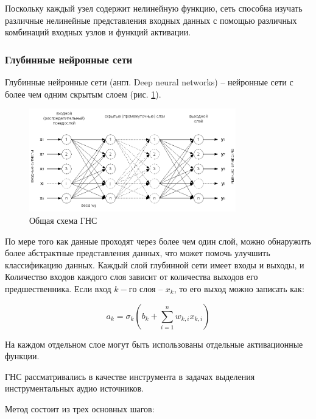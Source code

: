 Поскольку каждый узел содержит нелинейную функцию, сеть способна изучать различные нелинейные представления входных данных с помощью различных комбинаций входных узлов и функций активации.

\subsubsection{Глубинные нейронные сети}

Глубинные нейронные сети (англ. Deep neural networks) -- нейронные сети с более чем одним скрытым слоем (рис. \ref{anal:DNN}).

\begin{figure}
	\centering
	\includegraphics[width=0.8\textwidth]{inc/img/dnn.png}
	\caption{Общая схема ГНС}
	\label{anal:DNN}
\end{figure}

По мере того как данные проходят через более чем один слой, можно обнаружить более абстрактные представления данных, что может помочь улучшить классификацию данных. Каждый слой глубинной сети имеет входы и выходы, и Количество входов каждого слоя зависит от количества выходов его предшественника. Если вход $k-го$ слоя -- $x_k$, то его выход можно записать как:

\begin{equation}
a_k = \sigma_k( b_k + \sum_{i=1}^{n} w_{k,i} x_{k,i} )
\end{equation}

На каждом отдельном слое могут быть использованы отдельные активационные функции.

ГНС рассматривались в качестве инструмента в задачах выделения инструментальных аудио источников\cite{Uhlich}.

Метод состоит из трех основных шагов:

